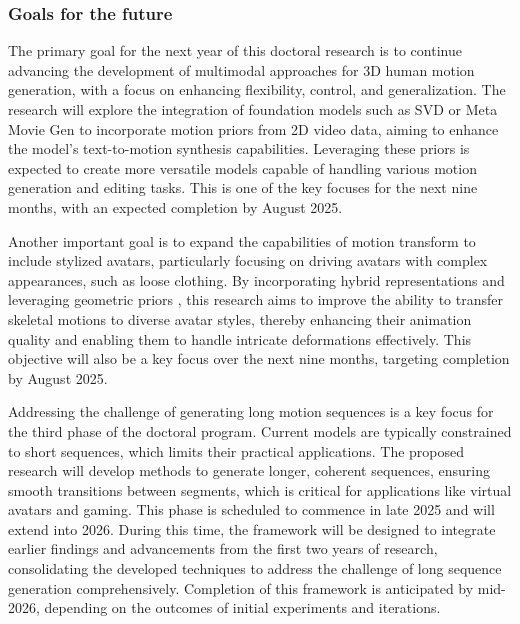\documentclass[a4paper, 12pt]{article}
\begin{document}
\subsubsection{Goals for the future}
The primary goal for the next year of this doctoral research is to continue advancing the development of multimodal approaches for 3D human motion generation, with a focus on enhancing flexibility, control, and generalization. The research will explore the integration of foundation models such as SVD \cite{blattmann2023stable} or Meta Movie Gen \cite{meta_movie_generation} to incorporate motion priors from 2D video data, aiming to enhance the model's text-to-motion synthesis capabilities. Leveraging these priors is expected to create more versatile models capable of handling various motion generation and editing tasks. This is one of the key focuses for the next nine months, with an expected completion by August 2025.

Another important goal is to expand the capabilities of motion transform to include stylized avatars, particularly focusing on driving avatars with complex appearances, such as loose clothing. By incorporating hybrid representations and leveraging geometric priors \cite{loper2023smpl}, this research aims to improve the ability to transfer skeletal motions to diverse avatar styles, thereby enhancing their animation quality and enabling them to handle intricate deformations effectively. This objective will also be a key focus over the next nine months, targeting completion by August 2025.

Addressing the challenge of generating long motion sequences is a key focus for the third phase of the doctoral program. Current models are typically constrained to short sequences, which limits their practical applications. The proposed research will develop methods to generate longer, coherent sequences, ensuring smooth transitions between segments, which is critical for applications like virtual avatars and gaming. This phase is scheduled to commence in late 2025 and will extend into 2026. During this time, the framework will be designed to integrate earlier findings and advancements from the first two years of research, consolidating the developed techniques to address the challenge of long sequence generation comprehensively. Completion of this framework is anticipated by mid-2026, depending on the outcomes of initial experiments and iterations.


\newpage 
\end{document}
